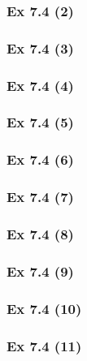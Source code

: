 \subsubsection{Ex 7.4 (2)}\label{sec:Ex_7.4.2}

\subsubsection{Ex 7.4 (3)}\label{sec:Ex_7.4.3}

\subsubsection{Ex 7.4 (4)}\label{sec:Ex_7.4.4}

\subsubsection{Ex 7.4 (5)}\label{sec:Ex_7.4.5}

\subsubsection{Ex 7.4 (6)}\label{sec:Ex_7.4.6}

\subsubsection{Ex 7.4 (7)}\label{sec:Ex_7.4.7}

\subsubsection{Ex 7.4 (8)}\label{sec:Ex_7.4.8}

\subsubsection{Ex 7.4 (9)}\label{sec:Ex_7.4.9}

\subsubsection{Ex 7.4 (10)}\label{sec:Ex_7.4.10}

\newpage		%

\subsubsection{Ex 7.4 (11)}\label{sec:Ex_7.4.11}

